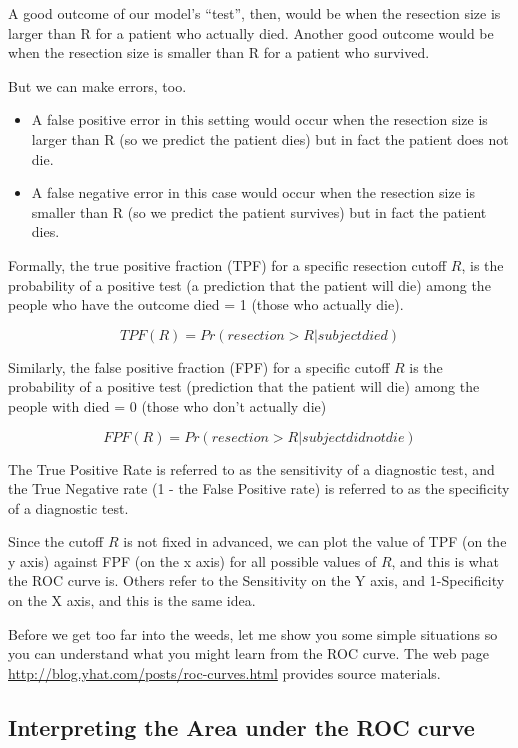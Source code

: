\documentclass[]{book}
\providecommand{\tightlist}{%
  \setlength{\itemsep}{0pt}\setlength{\parskip}{0pt}}
\theoremstyle{definition}
\theoremstyle{definition}
\theoremstyle{definition}
\theoremstyle{remark}
\begin{document}
A good outcome of our model's ``test'', then, would be when the
resection size is larger than R for a patient who actually died. Another
good outcome would be when the resection size is smaller than R for a
patient who survived.

But we can make errors, too.

\begin{itemize}
\tightlist
\item
  A false positive error in this setting would occur when the resection
  size is larger than R (so we predict the patient dies) but in fact the
  patient does not die.
\item
  A false negative error in this case would occur when the resection
  size is smaller than R (so we predict the patient survives) but in
  fact the patient dies.
\end{itemize}

Formally, the true positive fraction (TPF) for a specific resection
cutoff \(R\), is the probability of a positive test (a prediction that
the patient will die) among the people who have the outcome died = 1
(those who actually die).

\[
TPF(R) = Pr(resection > R | subject died)
\]

Similarly, the false positive fraction (FPF) for a specific cutoff \(R\)
is the probability of a positive test (prediction that the patient will
die) among the people with died = 0 (those who don't actually die)

\[
FPF(R) = Pr(resection > R | subject did not die)
\]

The True Positive Rate is referred to as the sensitivity of a diagnostic
test, and the True Negative rate (1 - the False Positive rate) is
referred to as the specificity of a diagnostic test.

Since the cutoff \(R\) is not fixed in advanced, we can plot the value
of TPF (on the y axis) against FPF (on the x axis) for all possible
values of \(R\), and this is what the ROC curve is. Others refer to the
Sensitivity on the Y axis, and 1-Specificity on the X axis, and this is
the same idea.

Before we get too far into the weeds, let me show you some simple
situations so you can understand what you might learn from the ROC
curve. The web page \url{http://blog.yhat.com/posts/roc-curves.html}
provides source materials.

\subsection{Interpreting the Area under the ROC
curve}\label{interpreting-the-area-under-the-roc-curve}
\end{document}
